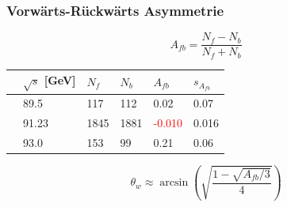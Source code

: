 \begin{frame}
	\frametitle{Vorwärts-Rückwärts Asymmetrie}
	\begin{equation*}
		A_{fb}=\frac{N_f-N_b}{N_f+N_b}
	\end{equation*}
	\begin{table}[h]\centering
		\begin{tabular}{@{}llllll@{}}
			\toprule
			&$\sqrt{s}$ [GeV]&$N_f$&$N_b$&$A_{fb}$&$s_{A_{fb}}$\\
			\midrule
			&89.5&117&112&0.02&0.07\\
			&91.23&1845&1881&\textcolor{red}{-0.010}&0.016\\
			&93.0&153&99&0.21&0.06\\
			\bottomrule
		\end{tabular}
	\end{table}
	\begin{equation*}
	\theta_w\approx\arcsin(\sqrt{\frac{1-\sqrt{A_{fb}/3}}{4}})
	\end{equation*}
\end{frame}




